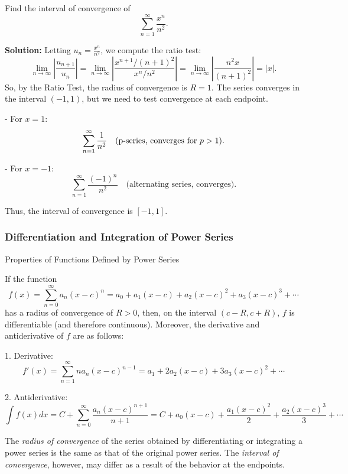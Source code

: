 \documentclass[12pt]{article}
\theoremstyle{beautifulthm}
\begin{document}
\begin{tcolorbox}[colback=examplebg, colframe=red!75!black, title=\textbf{EXAMPLE 7: Finding the Interval of Convergence}, fonttitle=\bfseries, sharp corners]
Find the interval of convergence of 
\[
\sum_{n=1}^\infty \frac{x^n}{n^2}.
\]


\tcblower
\textbf{Solution:} 
Letting \( u_n = \frac{x^n}{n^2} \), we compute the ratio test:
\[
\lim_{n \to \infty} \left| \frac{u_{n+1}}{u_n} \right| = \lim_{n \to \infty} \left| \frac{x^{n+1}/(n+1)^2}{x^n/n^2} \right| = \lim_{n \to \infty} \left| \frac{n^2 x}{(n+1)^2} \right| = |x|.
\]
So, by the Ratio Test, the radius of convergence is \( R = 1 \). The series converges in the interval \( (-1, 1) \), but we need to test convergence at each endpoint.

- For \( x = 1 \):
\[
\sum_{n=1}^\infty \frac{1}{n^2} \quad \text{(p-series, converges for \( p > 1 \)).}
\]

- For \( x = -1 \):
\[
\sum_{n=1}^\infty \frac{(-1)^n}{n^2} \quad \text{(alternating series, converges).}
\]

Thus, the interval of convergence is \( [-1, 1] \).
\end{tcolorbox}


\subsubsection{Differentiation and Integration of Power Series}

\begin{mytheorem}{Properties of Functions Defined by Power Series}{}

If the function 
\[
f(x) = \sum_{n=0}^\infty a_n (x-c)^n = a_0 + a_1(x-c) + a_2(x-c)^2 + a_3(x-c)^3 + \cdots
\]
has a radius of convergence of $R > 0$, then, on the interval $(c-R, c+R)$, $f$ is differentiable (and therefore continuous). Moreover, the derivative and antiderivative of $f$ are as follows:

1. Derivative:
\[
f'(x) = \sum_{n=1}^\infty n a_n (x-c)^{n-1} = a_1 + 2a_2(x-c) + 3a_3(x-c)^2 + \cdots
\]

2. Antiderivative:
\[
\int f(x) dx = C + \sum_{n=0}^\infty \frac{a_n (x-c)^{n+1}}{n+1} = C + a_0(x-c) + \frac{a_1(x-c)^2}{2} + \frac{a_2(x-c)^3}{3} + \cdots
\]

The \textit{radius of convergence} of the series obtained by differentiating or integrating a power series is the same as that of the original power series. The \textit{interval of convergence}, however, may differ as a result of the behavior at the endpoints.
    
\end{mytheorem}
\end{document}

